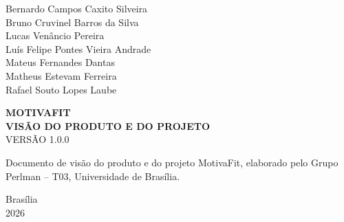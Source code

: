 \begin{center}
Bernardo Campos Caxito Silveira\\
Bruno Cruvinel Barros da Silva\\
Lucas Venâncio Pereira\\
Luís Felipe Pontes Vieira Andrade\\
Mateus Fernandes Dantas\\
Matheus Estevam Ferreira\\
Rafael Souto Lopes Laube

\vspace{2cm}
\textbf{MOTIVAFIT}\\[0.5cm]
\textbf{VISÃO DO PRODUTO E DO PROJETO}\\[0.5cm]
VERSÃO 1.0.0
\end{center}

\vspace{2cm}
\noindent\hspace*{0.5\textwidth}%
\begin{minipage}{0.5\textwidth}
Documento de visão do produto e do projeto MotivaFit, elaborado pelo
Grupo Perlman -- T03, Universidade de Brasília.
\end{minipage}

\vfill
\begin{center}
Brasília\\
2026
\end{center}
\clearpage
